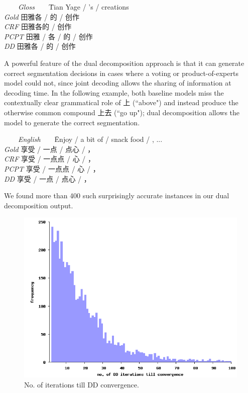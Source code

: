 \begin{small}
\begin{tabbing}
\ \ \ \ \= \emph{Gloss}\ \ \ \ \= Tian Yage / 's / creations \\
\> \emph{Gold} \>   田雅各 / 的 / 创作 \\
\> \emph{CRF} \>  田雅各的 / 创作 \\
\> \emph{PCPT} \>  田雅 / 各 / 的 / 创作 \\
\> \emph{DD} \>  田雅各 / 的 / 创作 \\
\end{tabbing}
\end{small}

A powerful feature of the dual decomposition approach is that it can generate correct segmentation decisions in cases where a voting or product-of-experts model could not, since joint decoding allows the sharing of information at decoding time. In the following example, both baseline models miss the contextually clear grammatical role of 上 (``above") and instead produce the otherwise common compound 上去 (``go up"); dual decomposition allows the model to generate the correct segmentation.
\begin{small}
\begin{tabbing}
\ \ \ \ \= \emph{English}\ \ \ \ \= Enjoy / a bit of / snack food / , ... \\
\> \emph{Gold} \>  享受 / 一点 / 点心 /  ，\\
\> \emph{CRF} \> 享受 / 一点点 / 心 / ，\\
\> \emph{PCPT} \> 享受 / 一点点 / 心 / ， \\
\> \emph{DD} \>  享受 / 一点 / 点心 / ，\\
\end{tabbing}
\end{small}
We found more than 400 such surprisingly accurate instances in our dual decomposition output.


\begin{figure}
\begin{center}
\includegraphics[width=\columnwidth]{histogram.png}
\caption{No. of iterations till DD convergence.}
\label{fig:histo}
\end{center}
\end{figure}



%
%
%
